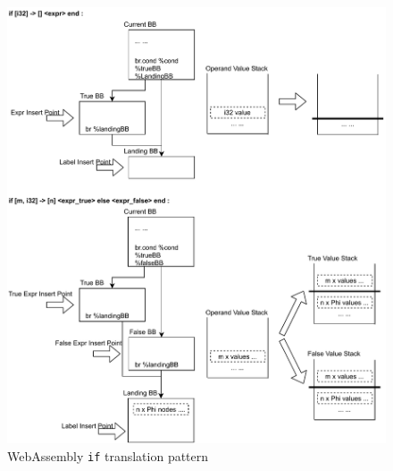 \begin{figure}
  \centering
  \includegraphics[width=\textwidth]{Images/4.MIR/translate-if.pdf}
  \caption{WebAssembly \texttt{if} translation pattern}
  \label{fig:translate-if}
\end{figure}

